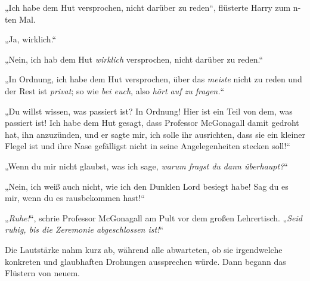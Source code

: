 „Ich habe dem Hut versprochen, nicht darüber zu reden“, flüsterte Harry zum n-ten Mal.

„Ja, wirklich.“

„Nein, ich hab dem Hut \emph{wirklich} versprochen, nicht darüber zu reden.“

„In Ordnung, ich habe dem Hut versprochen, über das \emph{meiste} nicht zu reden und der Rest ist \emph{privat}; so wie \emph{bei euch}, also \emph{hört auf zu fragen.}“

„Du willst wissen, was passiert ist? In Ordnung! Hier ist ein Teil von dem, was passiert ist! Ich habe dem Hut gesagt, dass Professor McGonagall damit gedroht hat, ihn anzuzünden, und er sagte mir, ich solle ihr ausrichten, dass sie ein kleiner Flegel ist und ihre Nase gefälligst nicht in seine Angelegenheiten stecken soll!“

„Wenn du mir nicht glaubst, was ich sage, \emph{warum fragst du dann überhaupt?}“

„Nein, ich weiß auch nicht, wie ich den Dunklen Lord besiegt habe! Sag du es mir, wenn du es rausbekommen hast!“

„\emph{Ruhe!}“, schrie Professor McGonagall am Pult vor dem großen Lehrertisch. „\emph{Seid ruhig, bis die Zeremonie abgeschlossen ist!}“

Die Lautstärke nahm kurz ab, während alle abwarteten, ob sie irgendwelche konkreten und glaubhaften Drohungen aussprechen würde. Dann begann das Flüstern von neuem.

